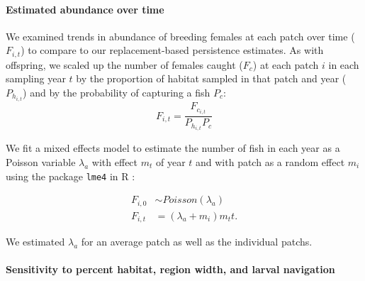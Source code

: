 \documentclass[12pt, oneside]{article}   	%
\begin{document}
\paragraph*{Estimated abundance over time}

We examined trends in abundance of breeding females at each patch over time ($F_{i,t}$) to compare to our replacement-based persistence estimates. As with offspring, we scaled up the number of females caught ($F_c$) at each patch $i$ in each sampling year $t$ by the proportion of habitat sampled in that patch and year ($P_{h_{i,t}}$) and by the probability of capturing a fish $P_c$:
\begin{equation}
F_{i,t} = \frac{F_{c_{i,t}}}{P_{h_{i,t}}P_c}
\end{equation}

We fit a mixed effects model to estimate the number of fish in each year as a Poisson variable $\lambda_a$ with effect $m_t$ of year $t$ and with patch as a random effect $m_i$ using the package \texttt{lme4} in R \citep{lme42015package}:

\begin{equation} \label{EQN_Abundance}
\begin{split}
F_{i,0} & \sim Poisson(\lambda_a) \\
F_{i,t} & = (\lambda_a + m_i)m_t t.
\end{split}
\end{equation}

We estimated $\lambda_a$ for an average patch as well as the individual patchs. %


\paragraph*{Sensitivity to percent habitat, region width, and larval navigation}
\end{document}
